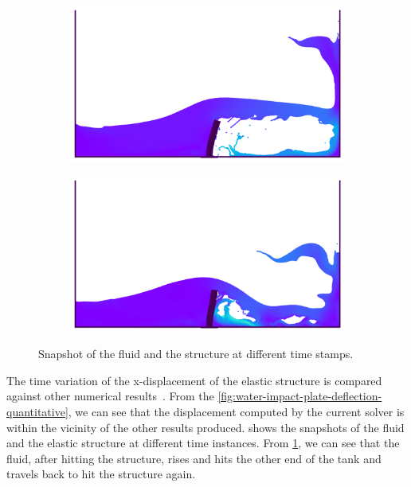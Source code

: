 \begin{figure}[H]
  \begin{subfigure}{0.48\textwidth}
    \centering
        \includegraphics[scale=0.5]{figures/fsi/figures/sun_2019_dam_breaking_flow_impacting_an_elastic_plate/snap_t_3.png}
  \end{subfigure}

  \begin{subfigure}{0.48\textwidth}
    \centering
    \includegraphics[scale=0.5]{figures/fsi/figures/sun_2019_dam_breaking_flow_impacting_an_elastic_plate/snap_t_4.png}
  \end{subfigure}
    \caption
    {
        Snapshot of the fluid and the structure at different time stamps.
    }
    \label{fig:dam-breaking-onto-plate-snapshot}
\end{figure}
The time variation of the x-displacement of the elastic structure is compared
against other numerical results~\citep{sun2019fully,bogaers2016evaluation}. From
the \cref{fig:water-impact-plate-deflection-quantitative}, we can see that the
displacement computed by the current solver is within the vicinity of the other
results produced.  shows the
snapshots of the fluid and the elastic structure at different time instances.
From \cref{fig:dam-breaking-onto-plate-snapshot}, we can see that the fluid,
after hitting the structure, rises and hits the other end of the tank and
travels back to hit the structure again.

